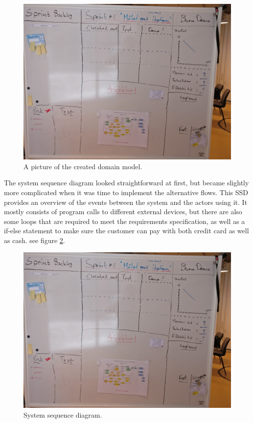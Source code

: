 \documentclass[a4paper]{scrreprt}
\begin{document}
\begin{figure}[h]
  \begin{center}
    \includegraphics[scale=0.2]{test.jpg}
    \caption{A picture of the created domain model.}
    \label{fig:dmodel}
  \end{center}
\end{figure}

\noindent The system sequence diagram looked straightforward at first, but became slightly more complicated when it was time to implement the alternative flows. This SSD provides an overview of the events between the system and the actors using it. It mostly consists of program calls to different external devices, but there are also some loops that are required to meet the requirements specification, as well as a if-else statement to make sure the customer can pay with both credit card as well as cash. see figure \ref{fig:ssd}.

\begin{figure}[h]
  \begin{center}
    \includegraphics[scale=0.2]{test.jpg}
    \caption{System sequence diagram.}
    \label{fig:ssd}
  \end{center}
\end{figure}
\end{document}
